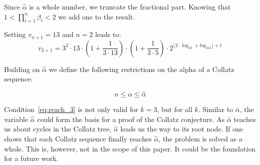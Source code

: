 \par\medskip
Since $\hat\alpha$ is a whole number, we truncate the fractional part. Knowing that $1<\prod_{i=1}^{n}\beta_i<2$ we add one to the result.

\bigskip
\begin{example}
Setting $v_{n+1}=13$ and $n=2$ leads to:
\[
v_{2+1}=3^2\cdot13\cdot\left(1+\frac{1}{3\cdot13}\right)\cdot\left(1+\frac{1}{3\cdot5}\right)\cdot2^{\lfloor2\cdot\log_23+log_213\rfloor+1}
\]
\end{example}

Building on $\hat\alpha$ we define the following restrictions on the alpha of a Collatz sequence:

\begin{equation}
\label{eq:reach_3}
n\le\alpha\le\hat\alpha
\end{equation}

Condition~\ref{eq:reach_3} is not only valid for $k=3$, but for all $k$. Similar to $\bar\alpha$, the variable $\hat\alpha$ could form the basis for a proof of the Collatz conjecture. As $\bar\alpha$ teaches us about cycles in the Collatz tree, $\hat\alpha$ leads us the way to its root node. If one shows that each Collatz sequence finally reaches $\hat\alpha$, the problem is solved as a whole. This is, however, not in the scope of this paper. It could be the foundation for a future work.
